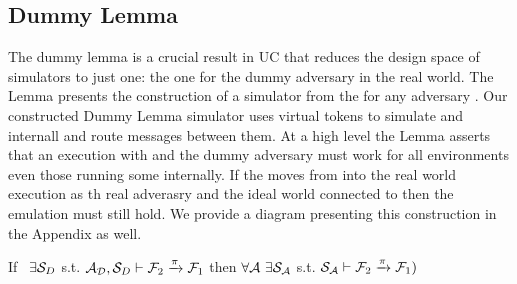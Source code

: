 \subsection{Dummy Lemma} \label{sec:dummy}
The dummy lemma is a crucial result in UC that reduces the design space of simulators to just one: the one for the dummy adversary in the real world.
The Lemma presents the construction of a simulator from the \DS for any adversary \A. Our constructed Dummy Lemma simulator uses virtual tokens to simulate \DS and \A internall and route messages between them.
At a high level the Lemma asserts that an execution with \DS and the dummy adversary must work for all environments even those running some \A internally.
If the \A moves from \Z into the real world execution as th real adverasry and the ideal world connected to \DS then the emulation must still hold.
We provide a diagram presenting this construction in the Appendix as well.
%

\begin{theorem}\label{thm:dummy}
If \ $\exists \mathcal{S}_{D}$ s.t. $ \mathcal{A}_\mathcal{D}, \mathcal{S}_{D} \vdash \mathcal{F}_2 \xrightarrow{\pi} \mathcal{F}_1$ then $\forall \mathcal{A} \ \exists \mathcal{S}_\mathcal{A}$ s.t. $\mathcal{S}_{\mathcal{A}} \vdash  \mathcal{F}_2 \xrightarrow{\pi} \mathcal{F}_1)$ 
\end{theorem}


